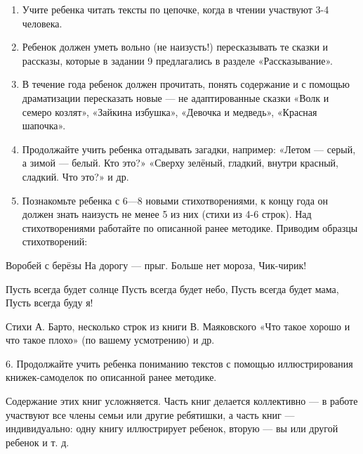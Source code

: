 \documentclass[a5paper]{book}
\begin{document}
\begin{enumerate}
\def\labelenumi{\arabic{enumi}.}
\item
  
  Учите ребенка читать тексты по цепочке, когда в чтении участвуют 3-4
  человека.
  
\item
  
  Ребенок должен уметь вольно (не наизусть!) пересказывать те сказки и
  рассказы, которые в задании 9 предлагались в разделе «Рассказывание».
  
\item
  
  В течение года ребенок должен прочитать, понять содержание и с помощью
  драматизации пересказать новые --- не адаптированные сказки «Волк и
  семеро козлят», «Зайкина избушка», «Девочка и медведь», «Красная
  шапочка».
  
\item
  
  Продолжайте учить ребенка отгадывать загадки, например: «Летом ---
  серый, а зимой --- белый. Кто это?» «Сверху зелёный, гладкий, внутри
  красный, сладкий. Что это?» и др.
  
\item
  
  Познакомьте ребенка с 6---8 новыми стихотворениями, к концу года он
  должен знать наизусть не менее 5 из них (стихи из 4-6 строк). Над
  стихотворениями работайте по описанной ранее методике. Приводим
  образцы стихотворений:
  
\end{enumerate}


Воробей с берёзы На дорогу --- прыг. Больше нет мороза, Чик-чирик!

Пусть всегда будет солнце Пусть всегда будет небо, Пусть всегда будет
мама, Пусть всегда буду я!

Стихи А. Барто, несколько строк из книги В. Маяковского «Что такое
хорошо и что такое плохо» (по вашему усмотрению) и др.

6. Продолжайте учить ребенка пониманию текстов с помощью иллюстрирования
книжек-самоделок по описанной ранее методике.

Содержание этих книг усложняется. Часть книг делается коллективно --- в
работе участвуют все члены семьи или другие ребятишки, а часть книг ---
индивидуально: одну книгу иллюстрирует ребенок, вторую --- вы или другой
ребенок и т. д.
\end{document}
